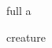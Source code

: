 \documentclass{article}
\begin{document}
\begin{tcard}{full}
a
\end{tcard}

\begin{tcard}{creature}
\end{tcard}
\end{document}
